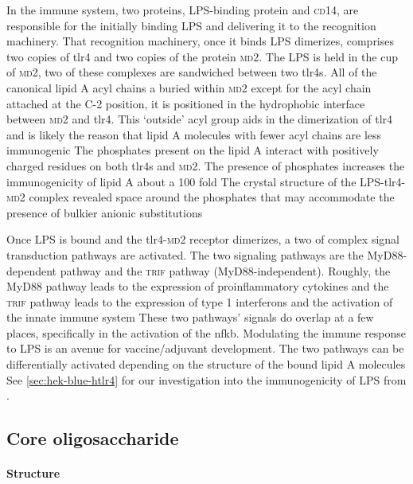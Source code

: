 In the immune system, two proteins, \ac{LPS}-binding protein and \textsc{cd}14, are responsible for the initially binding \ac{LPS} and delivering it to the recognition machinery. That recognition machinery, once it binds \ac{LPS} dimerizes, comprises two copies of \ac{tlr4} and two copies of the protein \textsc{md}2. The \ac{LPS} is held in the cup of \textsc{md}2, two of these complexes are sandwiched between two \acp{tlr4}. All of the canonical lipid A acyl chains a buried within \textsc{md}2 except for the acyl chain attached at the C-2 position, it is positioned in the hydrophobic interface between \textsc{md}2 and \ac{tlr4}. This `outside' acyl group aids in the dimerization of \ac{tlr4} and is likely the reason that lipid A molecules with fewer acyl chains are less immunogenic The phosphates present on the lipid A interact with positively charged residues on both \acp{tlr4} and \textsc{md}2. The presence of phosphates increases the immunogenicity of lipid A about a 100 fold The crystal structure of the \ac{LPS}-\ac{tlr4}-\textsc{md}2 complex revealed space around the phosphates that may accommodate the presence of bulkier anionic substitutions  

Once \ac{LPS} is bound and the \ac{tlr4}-\textsc{md}2 receptor dimerizes, a two of complex signal transduction pathways are activated. The two signaling pathways are the MyD88-dependent pathway and the \textsc{trif} pathway (MyD88-independent). Roughly, the MyD88 pathway leads to the expression of proinflammatory cytokines and the \textsc{trif} pathway leads to the expression of type 1 interferons and the activation of the innate immune system These two pathways' signals do overlap at a few places, specifically in the activation of the \ac{nfkb}. Modulating the immune response to \ac{LPS} is an avenue for vaccine/adjuvant development.  The two pathways can be differentially activated depending on the structure of the bound lipid A molecules See \cref{sec:hek-blue-htlr4} for our investigation into the immunogenicity of \ac{LPS} from \caulobacter.

  \subsection{Core oligosaccharide}\label{sec:core-oligosaccharide-intro}
  
    \paragraph{Structure}

